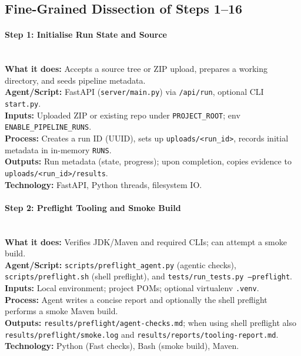 \documentclass[11pt,a4paper]{article}
\begin{document}
\subsection*{Fine-Grained Dissection of Steps 1--16}

\paragraph{Step 1: Initialise Run State and Source} \hfill\\
\textbf{What it does:} Accepts a source tree or ZIP upload, prepares a working directory, and seeds pipeline metadata.\\
\textbf{Agent/Script:} FastAPI (\texttt{server/main.py}) via \texttt{/api/run}, optional CLI \texttt{start.py}.\\
\textbf{Inputs:} Uploaded ZIP or existing repo under \texttt{PROJECT\_ROOT}; env \texttt{ENABLE\_PIPELINE\_RUNS}.\\
\textbf{Process:} Creates a run ID (UUID), sets up \texttt{uploads/\textless run\_id\textgreater{}}, records initial metadata in in-memory \texttt{RUNS}.\\
\textbf{Outputs:} Run metadata (state, progress); upon completion, copies evidence to \texttt{uploads/\textless run\_id\textgreater{}/results}.\\
\textbf{Technology:} FastAPI, Python threads, filesystem IO.

\paragraph{Step 2: Preflight Tooling and Smoke Build} \hfill\\
\textbf{What it does:} Verifies JDK/Maven and required CLIs; can attempt a smoke build.\\
\textbf{Agent/Script:} \texttt{scripts/preflight\_agent.py} (agentic checks), \texttt{scripts/preflight.sh} (shell preflight), and \texttt{tests/run\_tests.py --preflight}.\\
\textbf{Inputs:} Local environment; project POMs; optional virtualenv \texttt{.venv}.\\
\textbf{Process:} Agent writes a concise report and optionally the shell preflight performs a smoke Maven build.\\
\textbf{Outputs:} \texttt{results/preflight/agent-checks.md}; when using shell preflight also \texttt{results/preflight/smoke.log} and \texttt{results/reports/tooling-report.md}.\\
\textbf{Technology:} Python (Fast checks), Bash (smoke build), Maven.
\end{document}
